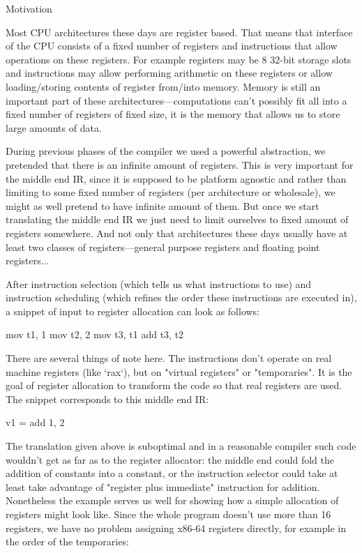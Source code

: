 \sec Motivation

Most CPU architectures these days are register based. That means that interface
of the CPU consists of a fixed number of registers and instructions that allow
operations on these registers. For example registers may be 8 32-bit storage slots
and instructions may allow performing arithmetic on these registers or allow
loading/storing contents of register from/into memory. Memory is still an
important part of these architectures---computations can't possibly fit all into
a fixed number of registers of fixed size, it is the memory that allows us to
store large amounts of data.

During previous phases of the compiler we used a powerful abstraction, we
pretended that there is an infinite amount of registers. This is very important
for the middle end IR, since it is supposed to be platform agnostic and rather
than limiting to some fixed number of registers (per architecture or wholesale),
we might as well pretend to have infinite amount of them. But once we start
translating the middle end IR we just need to limit ourselves to fixed amount of
registers somewhere. And not only that architectures these days usually have at
least two classes of registers---general purpose registers and floating point
registers...

After instruction selection (which tells us what instructions to use) and
instruction scheduling (which refines the order these instructions are executed
in), a snippet of input to register allocation can look as follows:

\begtt
mov t1, 1
mov t2, 2
mov t3, t1
add t3, t2
\endtt

There are several things of note here. The instructions don't operate on real
machine registers (like `rax`), but on "virtual registers" or "temporaries". It
is the goal of register allocation to transform the code so that real registers
are used. The snippet corresponds to this middle end IR:

\begtt
v1 = add 1, 2
\endtt

The translation given above is suboptimal and in a reasonable compiler such code
wouldn't get as far as to the register allocator: the middle end could fold the
addition of constants into a constant, or the instruction selector could take at
least take advantage of "register plus immediate" instruction for addition.
Nonetheless the example serves us well for showing how a simple allocation of
registers might look like. Since the whole program doesn't use more than 16
registers, we have no problem assigning x86-64 registers directly, for example
in the order of the temporaries:

